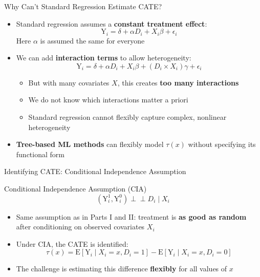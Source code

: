 \documentclass[dvipsnames,hyperref={pdfpagelabels=false}]{beamer}
\newcommand{\indep}{\perp\!\!\!\perp}
\begin{document}
\begin{frame}{Why Can't Standard Regression Estimate CATE?}
	\begin{itemize}
		\item Standard regression assumes a \textbf{constant treatment effect}:
		\begin{equation*}
			\mathrm{Y}_i = \delta + \alpha D_i + X_i \beta + \epsilon_i
		\end{equation*}
		Here $\alpha$ is assumed the same for everyone
		\vspace{0.3cm}
		\item We can add \textbf{interaction terms} to allow heterogeneity:
		\begin{equation*}
			\mathrm{Y}_i = \delta + \alpha D_i + X_i \beta + (D_i \times X_i)\gamma + \epsilon_i
		\end{equation*}
		\vspace{0.2cm}
		\begin{itemize}
			\item But with many covariates $X$, this creates \textbf{too many interactions}
			\vspace{0.2cm}
			\item We do not know which interactions matter a priori
			\vspace{0.2cm}
			\item Standard regression cannot flexibly capture complex, nonlinear heterogeneity
		\end{itemize}
		\vspace{0.3cm}
		\item \textbf{Tree-based ML methods} can flexibly model $\tau(x)$ without specifying its functional form
	\end{itemize}
\end{frame}




\begin{frame}{Identifying CATE: Conditional Independence Assumption}
	\begin{block}{Conditional Independence Assumption (CIA)}
		\begin{equation*}
			(\mathrm{Y}^{1}_{i}, \mathrm{Y}^{0}_{i}) \indep D_{i} \mid X_{i}
		\end{equation*}
	\end{block}
	\begin{itemize}
		\vspace{0.3cm}
		\item Same assumption as in Parts I and II: treatment is \textbf{as good as random} after conditioning on observed covariates $X_i$
		\vspace{0.3cm}
		\item Under CIA, the CATE is identified:
		\begin{equation*}
			\tau(x) = \mathrm{E}[\mathrm{Y}_i \mid X_i = x, D_i = 1] - \mathrm{E}[\mathrm{Y}_i \mid X_i = x, D_i = 0]
		\end{equation*}
		\vspace{0.2cm}
		\item The challenge is estimating this difference \textbf{flexibly} for all values of $x$
	\end{itemize}
\end{frame}
\end{document}
